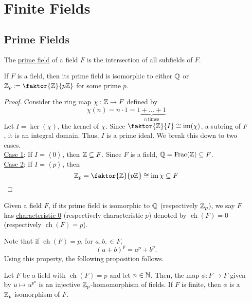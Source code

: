 \documentclass[11pt]{article}
\newcommand{\cyclic}[1]{\left\langle #1 \right\rangle}
\newcommand{\quotient}[2]{\faktor{#1}{#2}}
\DeclareMathOperator{\Frac}{Frac}
\DeclareMathOperator{\ch}{ch}
\begin{document}
\pagebreak
\section{Finite Fields}
\subsection{Prime Fields}
\begin{definition}
The \underline{prime field} of a field $F$ is the intersection of all subfields
of $F$.
\end{definition}
\begin{theorem}
If $F$ is a field, then its prime field is isomorphic to either $\mathbb{Q}$ or $\Z_p
\coloneqq \quotient{\Z}{p\Z}$ for some prime $p$.
\label{theorem16}
\end{theorem}
\begin{proof}
Consider the ring map $\chi:\mathbb{Z} \to F$ defined by
\begin{equation*}
\chi(n) = n\cdot 1 = \underbrace{1 + \dots + 1}_{n\,\text{times}}
\end{equation*}
Let $I = \ker(\chi)$, the kernel of $\chi$. Since $\quotient{\Z}{I} \cong
\im(\chi)$, a subring of $F$, it is an integral domain. Thus, $I$ is a prime
ideal. We break this down to two cases.\\
\underline{Case 1}: If $I = \cyclic{0}$, then $\mathbb{Z} \subseteq F$. Since $F$ is a
field, $\Q = \Frac(\Z) \subseteq F$.\\
\underline{Case 2}: If $I = \cyclic{p}$, then
\begin{equation*}
\Z_p = \quotient{\Z}{p\Z} \cong \im{\chi} \subseteq F
\end{equation*}
\end{proof}
\begin{definition}
Given a field $F$, if its prime field is isomorphic to $\mathbb{Q}$ (respectively
$\mathbb{Z}_p$), we say $F$ has \underline{characteristic 0} (respectively
characteristic $p$) denoted by $\ch(F) = 0$ (respectively $\ch(F) = p$).
\end{definition}
\begin{remark}
Note that if $\ch(F) = p$, for $a,b, \in F$,
\begin{equation*}
(a+b)^p = a^p + b^p.
\end{equation*}
Using this property, the following proposition follows.
\end{remark}
\begin{prop}
Let $F$ be a field with $\ch(F) = p$ and let $n\in\mathbb{N}$. Then, the map $\phi:F \to
F$ given by $u \mapsto u^{p^n}$ is an injective $\mathbb{Z}_p$-homomorphism of fields.
If $F$ is finite, then $\phi$ is a $\mathbb{Z}_p$-isomorphism of $F$.
\end{prop}
\end{document}
